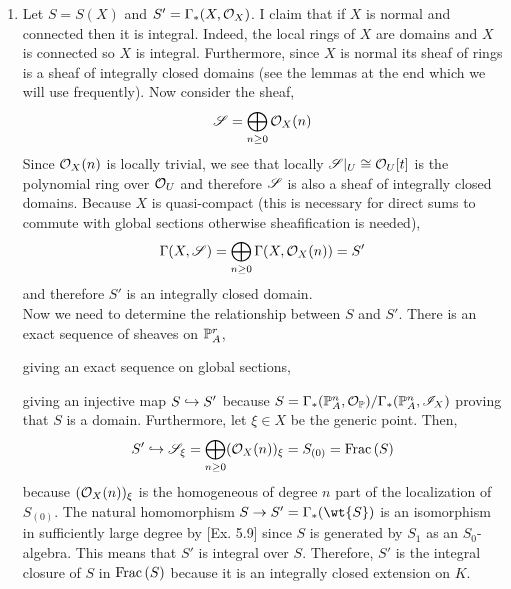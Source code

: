 \documentclass[12pt]{article}
\begin{document}
\begin{enumerate}
\item Let $S = S(X)$ and $S' = \Gamma_*(X, \struct{X})$. I claim that if $X$ is normal and connected then it is integral. Indeed, the local rings of $X$ are domains and $X$ is connected so $X$ is integral. Furthermore, since $X$ is normal its sheaf of rings is a sheaf of integrally closed domains (see the lemmas at the end which we will use frequently). Now consider the sheaf,
\[ \sS = \bigoplus_{n \ge 0} \struct{X}(n) \]
Since $\struct{X}(n)$ is locally trivial, we see that locally $\sS|_U \cong \struct{U}[t]$ is the polynomial ring over $\struct{U}$ and therefore $\sS$ is also a sheaf of integrally closed domains. Because $X$ is quasi-compact (this is necessary for direct sums to commute with global sections otherwise sheafification is needed),
\[ \Gamma(X, \sS) = \bigoplus_{n \ge 0} \Gamma(X, \struct{X}(n)) = S' \]
and therefore $S'$ is an integrally closed domain. 
\bigskip\\
Now we need to determine the relationship between $S$ and $S'$. There is an exact sequence of sheaves on $\P^r_A$,
\begin{center}
\end{center}
giving an exact sequence on global sections,
\begin{center}
\end{center}
giving an injective map $S \embed S'$ because $S = \Gamma_*(\P^n_A, \struct{\P}) / \Gamma_*(\P^n_A, \I_X)$ proving that $S$ is a domain. Furthermore, let $\xi \in X$ be the generic point. Then,
\[S' \embed \sS_\xi = \bigoplus_{n \ge 0} (\struct{X}(n))_\xi = S_{(0)} = \Frac{S} \]
because $(\struct{X}(n))_\xi$ is the homogeneous of degree $n$ part of the localization of $S_{(0)}$. 
The natural homomorphism $S \to S' = \Gamma_*(\wt{S})$ is an isomorphism in sufficiently large degree by [Ex. 5.9] since $S$ is generated by $S_1$ as an $S_0$-algebra. This means that $S'$ is integral over $S$.
Therefore, $S'$ is the integral closure of $S$ in $\Frac{S}$ because it is an integrally closed extension on $K$.


\end{enumerate}
\end{document}
